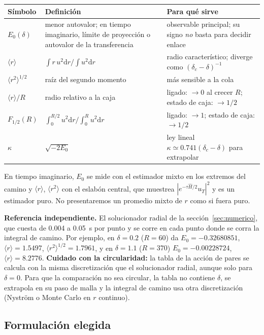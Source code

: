 \documentclass[11pt]{article}
\newcommand{\dd}{\mathrm{d}}
\newcommand{\dc}{\delta_c}
\begin{document}
\begin{table}[H]
\centering
\small
\begin{tabular}{@{}lL{5.3cm}L{6.2cm}@{}}
\toprule
\textbf{Símbolo} & \textbf{Definición} & \textbf{Para qué sirve}\\
\midrule
$E_0(\delta)$ & menor autovalor; en tiempo imaginario, límite de proyección o autovalor de la transferencia & observable principal; su signo \emph{no} basta para decidir enlace\\
$\langle r\rangle$ & $\int r\,u^2\dd r/\int u^2\dd r$ & radio característico; diverge como $(\dc-\delta)^{-1}$\\
$\langle r^2\rangle^{1/2}$ & raíz del segundo momento & más sensible a la cola\\
$\langle r\rangle/R$ & radio relativo a la caja & ligado: $\to0$ al crecer $R$; estado de caja: $\to1/2$\\
$F_{1/2}(R)$ & $\int_0^{R/2}u^2\dd r\big/\int_0^Ru^2\dd r$ & ligado: $\to1$; estado de caja: $\to1/2$\\
$\kappa$ & $\sqrt{-2E_0}$ & ley lineal $\kappa\simeq0.741(\dc-\delta)$ para extrapolar\\
\bottomrule
\end{tabular}
\end{table}

En tiempo imaginario, $E_0$ se mide con el estimador mixto en los extremos del camino y $\langle r\rangle$, $\langle r^2\rangle$ con el eslabón central, que muestrea $|e^{-\tau\hat H/2}u_T|^2$ y es un estimador puro. No presentaremos un promedio mixto de $r$ como si fuera puro.

\textbf{Referencia independiente.} El solucionador radial de la sección~\ref{sec:numerico}, que cuesta de 0.004 a 0.05~s por punto y se corre en cada punto donde se corra la integral de camino. Por ejemplo, en $\delta=0.2$ ($R=60$) da $E_0=-0.32680851$, $\langle r\rangle=1.5497$, $\langle r^2\rangle^{1/2}=1.7961$, y en $\delta=1.1$ ($R=370$) $E_0=-0.00228724$, $\langle r\rangle=8.2776$. \textbf{Cuidado con la circularidad:} la tabla de la acción de pares se calcula con la misma discretización que el solucionador radial, aunque solo para $\delta=0$. Para que la comparación no sea circular, la tabla no contiene $\delta$, se extrapola en su paso de malla y la integral de camino usa otra discretización (Nyström o Monte Carlo en $r$ continuo).

\subsection{Formulación elegida}
\end{document}
